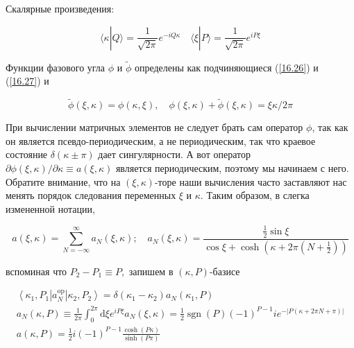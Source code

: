 \documentclass[main.tex]{subfiles}
\begin{document}
Скалярные произведения:

\begin{equation}\label{16.44}
\langle\kappa | Q\rangle=\frac{1}{\sqrt{2 \pi}} e^{-i Q \kappa}\quad
\langle\xi | P\rangle=\frac{1}{\sqrt{2 \pi}} e^{i P \xi}
\end{equation}

Функции фазового угла $\phi$ и $\tilde{\phi}$ определены как подчиняющиеся (\ref{16.26}) и (\ref{16.27}) и

\begin{equation}\label{16.45} 
\tilde{\phi}(\xi, \kappa)=\phi(\kappa, \xi), \quad \phi(\xi, \kappa)+\tilde{\phi}(\xi, \kappa)=\xi \kappa / 2 \pi
\end{equation}

При вычислении матричных элементов не следует брать сам оператор $\phi$, так как он является псевдо-периодическим, а не периодическим, так что краевое состояние $\delta(\kappa \pm \pi)$ дает сингулярности. А вот оператор $\partial \phi(\xi, \kappa) / \partial \kappa \equiv a(\xi, \kappa)$ является периодическим, поэтому мы начинаем с него. Обратите внимание, что на $(\xi, \kappa)$-торе наши вычисления часто заставляют нас менять порядок следования переменных $\xi$ и $\kappa .$ Таким образом, в слегка измененной нотации,

\begin{equation}\label{16.46}
	a(\xi, \kappa)=\sum_{N=-\infty}^{\infty} a_{N}(\xi, \kappa) ; \quad a_{N}(\xi, \kappa)=\frac{\frac{1}{2} \sin \xi}{\cos \xi+\cosh \left(\kappa+2 \pi\left(N+\frac{1}{2}\right)\right)}
\end{equation}

вспоминая что $P_{2}-P_{1} \equiv P,$ запишем в $(\kappa, P)$-базисе

\begin{equation}\label{16.47} 
\begin{array}{l}
{\left\langle\kappa_{1}, P_{1}\left|a_{N}^{\mathrm{op}}\right| \kappa_{2}, P_{2}\right\rangle=\delta\left(\kappa_{1}-\kappa_{2}\right) a_{N}\left(\kappa_{1}, P\right)} \\
{a_{N}(\kappa, P) \equiv \frac{1}{2 \pi} \int_{0}^{2 \pi} \mathrm{d} \xi e^{i P \xi} a_{N}(\xi, \kappa)=\frac{1}{2} \operatorname{sgn}(P)(-1)^{P-1} i e^{-|P(\kappa+2 \pi N+\pi)|}} \\
{a(\kappa, P)=\frac{1}{2} i(-1)^{P-1} \frac{\cosh (P \kappa)}{\sinh (P \pi)}}
\end{array}
\end{equation}
\end{document}
